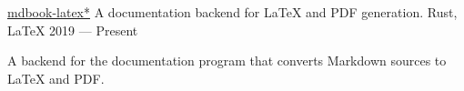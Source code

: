 \showoff
{\textcolor{my-blue}{\href{https://liambeckman.com/mdbook-latex}{mdbook-latex\textcolor{my-red}{*}}}}
{A documentation backend for \LaTeX{} and PDF generation.}
{Rust, \LaTeX{}}
{2019 --- Present}

A backend for the  documentation program that converts Markdown sources to \LaTeX{} and PDF.

